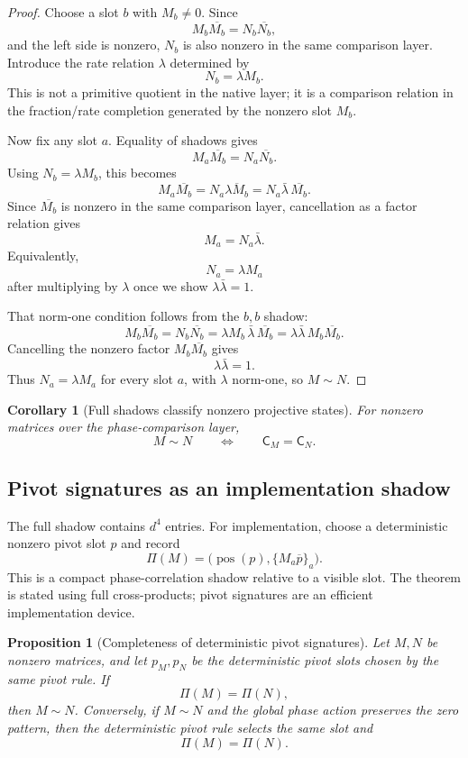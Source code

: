 \documentclass[11pt]{article}
\newtheorem{proposition}[definition]{Proposition}
\newtheorem{corollary}[definition]{Corollary}
\newcommand{\shadow}{\mathsf C}
\begin{document}
\begin{proof}
Choose a slot $b$ with $M_b\ne0$.  Since
\[
    M_b\overline{M_b}=N_b\overline{N_b},
\]
and the left side is nonzero, $N_b$ is also nonzero in the same comparison layer.  Introduce the rate relation $\lambda$ determined by
\[
    N_b=\lambda M_b.
\]
This is not a primitive quotient in the native layer; it is a comparison relation in the fraction/rate completion generated by the nonzero slot $M_b$.

Now fix any slot $a$.  Equality of shadows gives
\[
    M_a\overline{M_b}
    =
    N_a\overline{N_b}.
\]
Using $N_b=\lambda M_b$, this becomes
\[
    M_a\overline{M_b}
    =
    N_a\overline{\lambda M_b}
    =
    N_a\bar\lambda\,\overline{M_b}.
\]
Since $\overline{M_b}$ is nonzero in the same comparison layer, cancellation as a factor relation gives
\[
    M_a=N_a\bar\lambda.
\]
Equivalently,
\[
    N_a=\lambda M_a
\]
after multiplying by $\lambda$ once we show $\lambda\bar\lambda=1$.

That norm-one condition follows from the $b,b$ shadow:
\[
    M_b\overline{M_b}
    =
    N_b\overline{N_b}
    =
    \lambda M_b\,\bar\lambda\,\overline{M_b}
    =
    \lambda\bar\lambda\,M_b\overline{M_b}.
\]
Cancelling the nonzero factor $M_b\overline{M_b}$ gives
\[
    \lambda\bar\lambda=1.
\]
Thus $N_a=\lambda M_a$ for every slot $a$, with $\lambda$ norm-one, so $M\sim N$.
\end{proof}

\begin{corollary}[Full shadows classify nonzero projective states]
For nonzero matrices over the phase-comparison layer,
\[
    M\sim N
    \qquad\Longleftrightarrow\qquad
    \shadow_M=\shadow_N.
\]
\end{corollary}

\subsection{Pivot signatures as an implementation shadow}

The full shadow contains $d^4$ entries.  For implementation, choose a deterministic nonzero pivot slot $p$ and record
\[
    \Pi(M)=\bigl(\operatorname{pos}(p),\{M_a\overline p\}_a\bigr).
\]
This is a compact phase-correlation shadow relative to a visible slot.  The theorem is stated using full cross-products; pivot signatures are an efficient implementation device.

\begin{proposition}[Completeness of deterministic pivot signatures]
Let $M,N$ be nonzero matrices, and let $p_M,p_N$ be the deterministic pivot slots chosen by the same pivot rule.  If
\[
    \Pi(M)=\Pi(N),
\]
then $M\sim N$.
Conversely, if $M\sim N$ and the global phase action preserves the zero pattern, then the deterministic pivot rule selects the same slot and
\[
    \Pi(M)=\Pi(N).
\]
\end{proposition}
\end{document}
